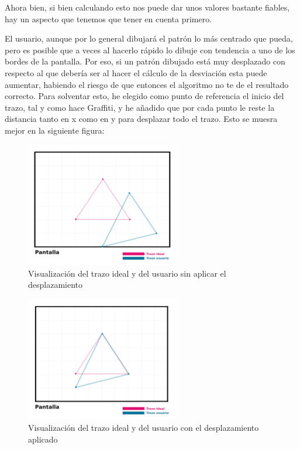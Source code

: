 \vspace{0.5cm}

Ahora bien, si bien calculando esto nos puede dar unos valores bastante fiables, hay un aspecto que tenemos que tener en cuenta primero.

\vspace{0.5cm}

El usuario, aunque por lo general dibujará el patrón lo más centrado que pueda, pero es posible que a veces al hacerlo rápido lo dibuje con tendencia a uno de los bordes de la pantalla. Por eso, si un patrón dibujado está muy desplazado con respecto al que debería ser al hacer el cálculo de la desviación esta puede aumentar, habiendo el riesgo de que entonces el algoritmo no te de el resultado correcto. Para solventar esto, he elegido como punto de referencia el inicio del trazo, tal y como hace Graffiti, y he añadido que por cada punto le reste la distancia tanto en x como en y para desplazar todo el trazo. Esto se muesra mejor en la siguiente figura:

\vspace{0.5cm}

\begin{figure}[htbp]
\centering
  \includegraphics[width=0.6\textwidth]{archivos/shape_not_displaced.png}
  \caption{Visualización del trazo ideal y del usuario sin aplicar el desplazamiento}
  \label{fig:shape_not_displaced}
\end{figure}

\clearpage

\begin{figure}[htbp]
\centering
  \includegraphics[width=0.6\textwidth]{archivos/shape_displaced.png}
  \caption{Visualización del trazo ideal y del usuario con el desplazamiento aplicado}
  \label{fig:shape_displaced}
\end{figure}

